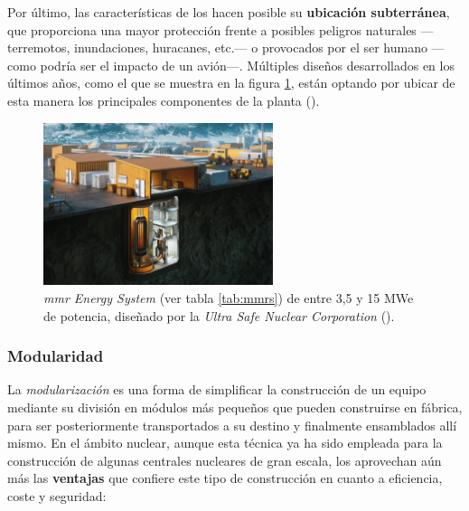 Por último, las características de los  hacen posible su \textbf{ubicación subterránea}, que proporciona una mayor protección frente a posibles peligros naturales ---terremotos, inundaciones, huracanes, etc.--- o provocados por el ser humano ---como podría ser el impacto de un avión---. Múltiples diseños desarrollados en los últimos años, como el que se muestra en la figura \ref{fig:ultra_safe_nuclear_mmr}, están optando por ubicar de esta manera los principales componentes de la planta (\cite{nea_smrs_2021}).

\begin{figure}[h]
  \centering
  \includegraphics[width=0.6\textwidth]{content/figures/ultra_safe_nuclear_mmr.jpg}
  \caption{\emph{\acrshort{mmr} Energy System} (ver tabla \ref{tab:mmrs}) de entre 3,5 y 15 MWe de potencia, diseñado por la \emph{Ultra Safe Nuclear Corporation} (\cite{ultra_safe_nuclear_corporation}).}
  \label{fig:ultra_safe_nuclear_mmr}
\end{figure}

\subsubsection{Modularidad} \label{modularidad}

La \emph{modularización} es una forma de simplificar la construcción de un equipo mediante su división en módulos más pequeños que pueden construirse en fábrica, para ser posteriormente transportados a su destino y finalmente ensamblados allí mismo. En el ámbito nuclear, aunque esta técnica ya ha sido empleada para la construcción de algunas centrales nucleares de gran escala, los  aprovechan aún más las \textbf{ventajas} que confiere este tipo de construcción en cuanto a eficiencia, coste y seguridad:

